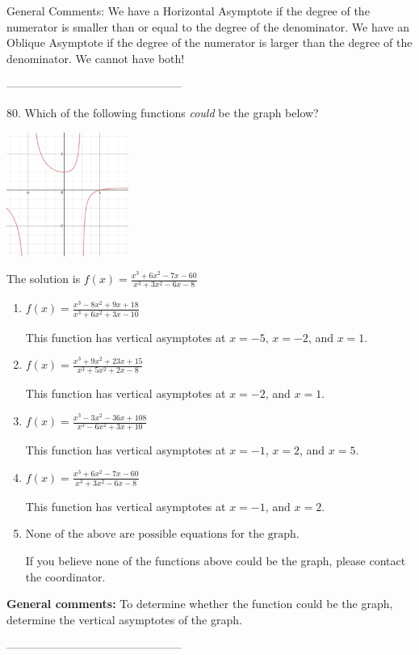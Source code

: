 \documentclass{extbook}[14pt]
\begin{document}
General Comments: We have a Horizontal Asymptote if the degree of the numerator is smaller than or equal to the degree of the denominator. We have an Oblique Asymptote if the degree of the numerator is larger than the degree of the denominator. We cannot have both!

-----------------------------------------------

80. Which of the following functions \textit{could} be the graph below?
\begin{center} \includegraphics[width=0.3\textwidth]{../Figures/identifyGraphOfRationalFunctionB.png} \end{center} 

The solution is $ f(x) = \frac{x^{3} +6 x^{2} -7 x -60}{x^{3} +3 x^{2} -6 x -8} $ 

\begin{enumerate}[label=\Alph*.] 
\item $ f(x) = \frac{x^{3} -8 x^{2} +9 x + 18}{x^{3} +6 x^{2} +3 x -10} $ 

 This function has vertical asymptotes at $x=-5$, $x=-2$, and $x=1$. 
\item $ f(x) = \frac{x^{3} +9 x^{2} +23 x + 15}{x^{3} +5 x^{2} +2 x -8} $ 

 This function has vertical asymptotes at $x=-2$, and $x=1$. 
\item $ f(x) = \frac{x^{3} -3 x^{2} -36 x + 108}{x^{3} -6 x^{2} +3 x + 10} $ 

 This function has vertical asymptotes at $x=-1$, $x=2$, and $x=5$. 
\item $ f(x) = \frac{x^{3} +6 x^{2} -7 x -60}{x^{3} +3 x^{2} -6 x -8} $ 

 This function has vertical asymptotes at $x=-1$, and $x=2$. 
\item $ \text{None of the above are possible equations for the graph.} $ 

 If you believe none of the functions above could be the graph, please contact the coordinator. 
\end{enumerate} 
 
\textbf{General comments:} To determine whether the function could be the graph, determine the vertical asymptotes of the graph.

-----------------------------------------------
\end{document}
